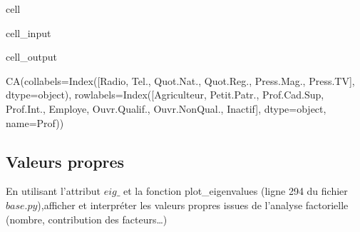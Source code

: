 \documentclass[letterpaper,10pt,french]{sphinxmanual}
\begin{document}
\begin{sphinxuseclass}{cell}
\begin{sphinxuseclass}{cell_input}
\begin{sphinxVerbatim}[commandchars=\\\{\}]
   
  
\end{sphinxVerbatim}

\end{sphinxuseclass}
\begin{sphinxuseclass}{cell_output}
\begin{sphinxVerbatim}[commandchars=\\\{\}]
CA(col\PYGZus{}labels=Index([\PYGZsq{}Radio\PYGZsq{}, \PYGZsq{}Tel.\PYGZsq{}, \PYGZsq{}Quot.Nat.\PYGZsq{}, \PYGZsq{}Quot.Reg.\PYGZsq{}, \PYGZsq{}Press.Mag.\PYGZsq{}, \PYGZsq{}Press.TV\PYGZsq{}], dtype=\PYGZsq{}object\PYGZsq{}),
   row\PYGZus{}labels=Index([\PYGZsq{}Agriculteur\PYGZsq{}, \PYGZsq{}Petit.Patr.\PYGZsq{}, \PYGZsq{}Prof.Cad.Sup\PYGZsq{}, \PYGZsq{}Prof.Int.\PYGZsq{}, \PYGZsq{}Employe\PYGZsq{},
       \PYGZsq{}Ouvr.Qualif.\PYGZsq{}, \PYGZsq{}Ouvr.Non\PYGZhy{}Qual.\PYGZsq{}, \PYGZsq{}Inactif\PYGZsq{}],
      dtype=\PYGZsq{}object\PYGZsq{}, name=\PYGZsq{}Prof\PYGZsq{}))
\end{sphinxVerbatim}

\end{sphinxuseclass}
\end{sphinxuseclass}

\subsection{Valeurs propres}
\label{\detokenize{TP3_AFC_ACM:valeurs-propres}}
\sphinxAtStartPar
En utilisant l’attribut \(eig\_\) et la fonction plot\_eigenvalues (ligne 294 du fichier \(base.py\)),afficher et interpréter les valeurs propres issues de l’analyse factorielle (nombre, contribution des facteurs…)
\end{document}
